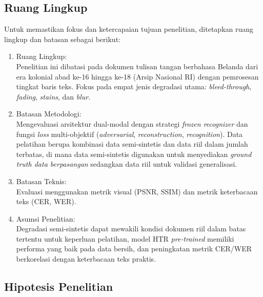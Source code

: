 \subsection{Ruang Lingkup}
\label{subsec:ruang-lingkup}

Untuk memastikan fokus dan ketercapaian tujuan penelitian, ditetapkan ruang lingkup dan batasan sebagai berikut:

\begin{enumerate}[label=\arabic*., leftmargin=0.5cm]
    \item Ruang Lingkup: \\
    Penelitian ini dibatasi pada dokumen tulisan tangan berbahasa Belanda dari era kolonial abad ke-16 hingga ke-18 (Arsip Nasional RI) dengan pemrosesan tingkat baris teks. Fokus pada empat jenis degradasi utama: \textit{bleed-through}, \textit{fading}, \textit{stains}, dan \textit{blur}.


    \item Batasan Metodologi: \\
    Mengevaluasi arsitektur dual-modal dengan strategi \textit{frozen recognizer} dan fungsi \textit{loss} multi-objektif (\textit{adversarial}, \textit{reconstruction}, \textit{recognition}). Data pelatihan berupa kombinasi data semi-sintetis dan data riil dalam jumlah terbatas, di mana data semi-sintetis digunakan untuk menyediakan \textit{ground truth data berpasangan} sedangkan data riil untuk validasi generalisasi.


    \item Batasan Teknis: \\
    Evaluasi menggunakan metrik visual (PSNR, SSIM) dan metrik keterbacaan teks (CER, WER).


    \item Asumsi Penelitian: \\
    Degradasi semi-sintetis dapat mewakili kondisi dokumen riil dalam batas tertentu untuk keperluan pelatihan, model HTR \textit{pre-trained} memiliki performa yang baik pada data bersih, dan peningkatan metrik CER/WER berkorelasi dengan keterbacaan teks praktis.
\end{enumerate}

\vspace{0.8em}
\subsection{Hipotesis Penelitian}
\label{subsec:hipotesis}

